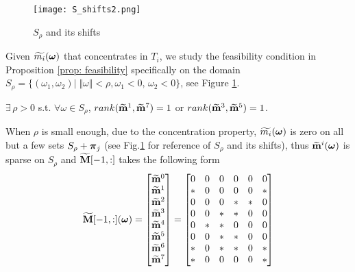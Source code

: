 \begin{figure}
\centering
\texttt{[image: S\_shifts2.png]}
\caption{$S_{\rho}$ and its shifts}
\label{fig: S-shifts}
\end{figure}
Given $\widetilde{m_{i}}(\boldsymbol{\omega})$ that concentrates in $T_i$, we study the feasibility condition in Proposition \ref{prop: feasibility} specifically on the domain $S_{\rho} = \{(\omega_1,\omega_2)|\;\Vert\omega\Vert < \rho, \omega_1 <0,\,\omega_2<0\}$, see Figure \ref{fig: S-shifts}. 

\begin{lemma}\label{lem: rank1}
$\exists\, \rho>0$ s.t. $\forall \omega\in S_\rho$, $rank(\widetilde{\mathbf{m}}^{1},\widetilde{\mathbf{m}}^{7})=1$ or $rank(\widetilde{\mathbf{m}}^{3},\widetilde{\mathbf{m}}^{5}) = 1$.
\end{lemma}
When $\rho$ is small enough, due to the concentration property, $\widetilde{m_{i}}(\boldsymbol{\omega})$ is zero on all but a few sets $S_\rho + \boldsymbol{\pi}_j$ (see Fig.\ref{fig: S-shifts} for reference of $S_\rho$ and its shifts), thus $\widetilde{\mathbf{m}}^{i}(\boldsymbol{\omega})$ is sparse on $S_\rho$ and $\widetilde{\mathbf{M}}[-1,:]$ takes the following form
\begin{align}
\label{eq: sparse-mat}
\widetilde{\mathbf{M}}[-1,:](\boldsymbol{\omega})=
\begin{bmatrix}
\widetilde{\mathbf{m}}^{0}\\
\widetilde{\mathbf{m}}^{1}\\
\widetilde{\mathbf{m}}^{2}\\
\widetilde{\mathbf{m}}^{3}\\
\widetilde{\mathbf{m}}^{4}\\
\widetilde{\mathbf{m}}^{5}\\
\widetilde{\mathbf{m}}^{6}\\
\widetilde{\mathbf{m}}^{7}
\end{bmatrix}
=
\begin{bmatrix}
0 & 0 & 0 & 0 & 0 & 0\\
* & 0 & 0 & 0 & 0 & *\\
0 & 0 & 0 & * & * & 0\\
0 & 0 & * & * & 0 & 0\\
0 & * & * & 0 & 0 & 0\\
0 & 0 & * & * & 0 & 0\\
* & 0 & * & * & 0 & *\\
* & 0 & 0 & 0 & 0 & *
\end{bmatrix}
\end{align}
